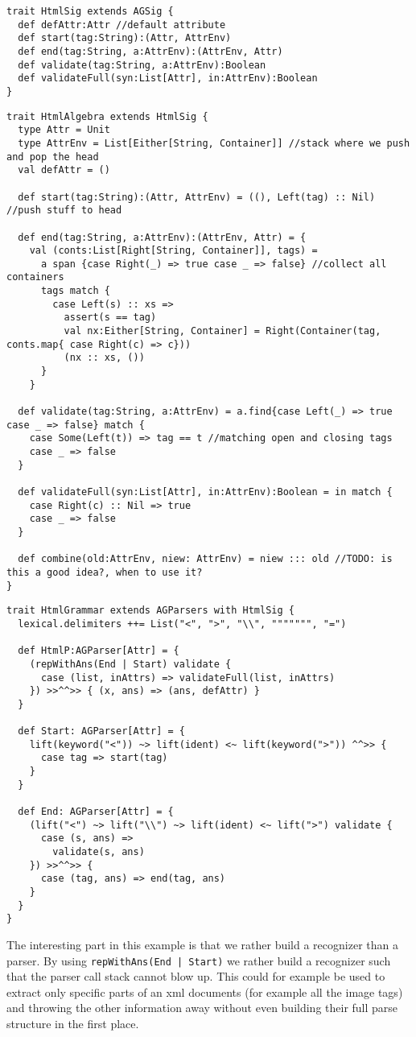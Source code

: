 \begin{lstlisting}
trait HtmlSig extends AGSig {
  def defAttr:Attr //default attribute
  def start(tag:String):(Attr, AttrEnv)
  def end(tag:String, a:AttrEnv):(AttrEnv, Attr)
  def validate(tag:String, a:AttrEnv):Boolean
  def validateFull(syn:List[Attr], in:AttrEnv):Boolean
}
\end{lstlisting}

\begin{lstlisting}
trait HtmlAlgebra extends HtmlSig {
  type Attr = Unit
  type AttrEnv = List[Either[String, Container]] //stack where we push and pop the head
  val defAttr = ()

  def start(tag:String):(Attr, AttrEnv) = ((), Left(tag) :: Nil) //push stuff to head

  def end(tag:String, a:AttrEnv):(AttrEnv, Attr) = {
    val (conts:List[Right[String, Container]], tags) =
      a span {case Right(_) => true case _ => false} //collect all containers
      tags match {
        case Left(s) :: xs =>
          assert(s == tag)
          val nx:Either[String, Container] = Right(Container(tag, conts.map{ case Right(c) => c}))
          (nx :: xs, ())
      }
    }

  def validate(tag:String, a:AttrEnv) = a.find{case Left(_) => true case _ => false} match {
    case Some(Left(t)) => tag == t //matching open and closing tags
    case _ => false
  }

  def validateFull(syn:List[Attr], in:AttrEnv):Boolean = in match {
    case Right(c) :: Nil => true
    case _ => false
  }

  def combine(old:AttrEnv, niew: AttrEnv) = niew ::: old //TODO: is this a good idea?, when to use it?
}
\end{lstlisting}

\begin{lstlisting}
trait HtmlGrammar extends AGParsers with HtmlSig {
  lexical.delimiters ++= List("<", ">", "\\", """"""", "=")

  def HtmlP:AGParser[Attr] = {
    (repWithAns(End | Start) validate {
      case (list, inAttrs) => validateFull(list, inAttrs)
    }) >>^^>> { (x, ans) => (ans, defAttr) }
  }

  def Start: AGParser[Attr] = {
    lift(keyword("<")) ~> lift(ident) <~ lift(keyword(">")) ^^>> {
      case tag => start(tag)
    }
  }

  def End: AGParser[Attr] = {
    (lift("<") ~> lift("\\") ~> lift(ident) <~ lift(">") validate {
      case (s, ans) =>
        validate(s, ans)
    }) >>^^>> {
      case (tag, ans) => end(tag, ans)
    }
  }
}
\end{lstlisting}

The interesting part in this example is that we rather build a recognizer than a parser. By using \verb/repWithAns(End | Start)/ we rather build a recognizer such that the parser call stack cannot blow up.
This could for example be used to extract only specific parts of an xml documents (for example all the image tags) and throwing the other information away without even building their full parse structure in the first place.
